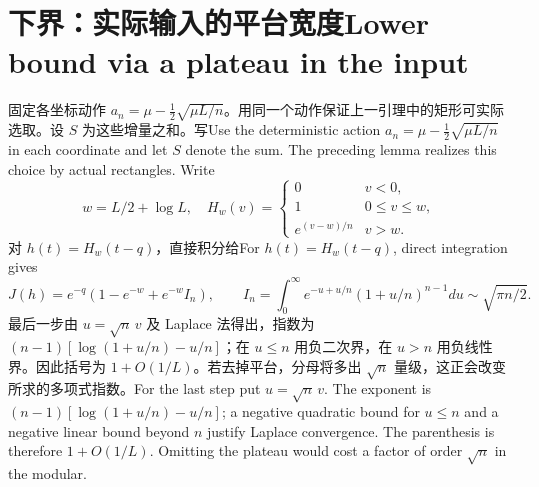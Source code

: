 \documentclass[UTF8,fontset=fandol,11pt]{ctexart}
\newcommand{\bi}[2]{\ifdefined\ResearchPaperChinese #1\else #2\fi}
\begin{document}
\section{\bi{下界：实际输入的平台宽度}{Lower bound via a plateau in the input}}
\bi{固定各坐标动作 $a_n=\mu-\frac12\sqrt{\mu L/n}$。用同一个动作保证上一引理中的矩形可实际选取。设 $S$ 为这些增量之和。写}{Use the deterministic action $a_n=\mu-\frac12\sqrt{\mu L/n}$ in each coordinate and let $S$ denote the sum. The preceding lemma realizes this choice by actual rectangles. Write}
\[
 w=L/2+\log L,\quad H_w(v)=
 \begin{cases}0&v<0,\\1&0\le v\le w,\\ e^{(v-w)/n}&v>w.\end{cases}
\]
\bi{对 $h(t)=H_w(t-q)$，直接积分给}{For $h(t)=H_w(t-q)$, direct integration gives}
\[
 J(h)=e^{-q}(1-e^{-w}+e^{-w}I_n),\qquad
 I_n=\int_0^\infty e^{-u+u/n}(1+u/n)^{n-1}du\sim\sqrt{\pi n/2}.
\]
\bi{最后一步由 $u=\sqrt n\,v$ 及 Laplace 法得出，指数为 $(n-1)[\log(1+u/n)-u/n]$；在 $u\le n$ 用负二次界，在 $u>n$ 用负线性界。因此括号为 $1+O(1/L)$。若去掉平台，分母将多出 $\sqrt n$ 量级，这正会改变所求的多项式指数。}{For the last step put $u=\sqrt n\,v$. The exponent is $(n-1)[\log(1+u/n)-u/n]$; a negative quadratic bound for $u\le n$ and a negative linear bound beyond $n$ justify Laplace convergence. The parenthesis is therefore $1+O(1/L)$. Omitting the plateau would cost a factor of order $\sqrt n$ in the modular.}
\end{document}
